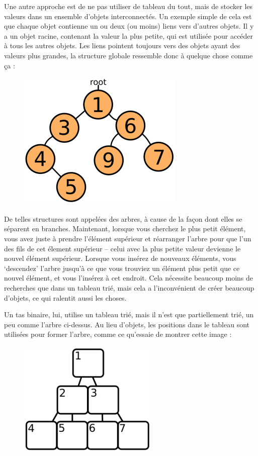 \documentclass{FramateX}
\begin{document}
Une autre approche est de ne pas utiliser de tableau du tout, mais de
stocker les valeurs dans un ensemble d'objets interconnectés. Un exemple
simple de cela est que chaque objet contienne un ou deux (ou moins)
liens vers d'autres objets. Il y a un objet racine, contenant la valeur
la plus petite, qui est utilisée pour accéder à tous les autres objets.
Les liens pointent toujours vers des objets ayant des valeurs plus
grandes, la structure globale ressemble donc à quelque chose comme ça :

\begin{figure}[ht!]
\centering
\includegraphics{img/tree.png}
\caption{}
\end{figure}

De telles structures sont appelées des arbres, à cause de la façon dont
elles se séparent en branches. Maintenant, lorsque vous cherchez le plus
petit élément, vous avez juste à prendre l'élément supérieur et
réarranger l'arbre pour que l'un des fils de cet élement supérieur --
celui avec la plus petite valeur devienne le nouvel élément supérieur.
Lorsque vous insérez de nouveaux éléments, vous `descendez' l'arbre
jusqu'à ce que vous trouviez un élément plus petit que ce nouvel
élément, et vous l'insérez à cet endroit. Cela nécessite beaucoup moins
de recherches que dans un tableau trié, mais cela a l'inconvénient de
créer beaucoup d'objets, ce qui ralentit aussi les choses.

\begin{center}\end{center}

Un tas binaire, lui, utilise un tableau trié, mais il n'est que
partiellement trié, un peu comme l'arbre ci-dessus. Au lieu d'objets,
les positions dans le tableau sont utilisées pour former l'arbre, comme
ce qu'essaie de montrer cette image :

\begin{figure}[ht!]
\centering
\includegraphics{img/heap.png}
\caption{}
\end{figure}
\end{document}
